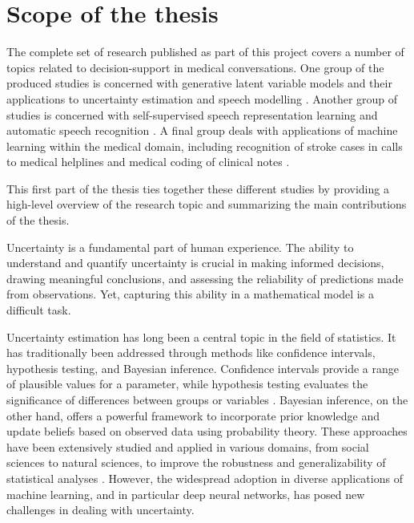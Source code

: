 

\section{Scope of the thesis}
%
%
The complete set of research published as part of this project covers a number of topics related to decision-support in medical conversations. 
One group of the produced studies is concerned with generative latent variable models and their applications to uncertainty estimation and speech modelling \cite{havtorn_hierarchical_2021,havtorn_benchmarking_2022,bergamin_modelagnostic_2022}. 
Another group of studies is concerned with self-supervised speech representation learning and automatic speech recognition \cite{borgholt_scaling_2021,borgholt_we_2021,mohamed_selfsupervised_2022,borgholt_brief_2022}. 
A final group deals with applications of machine learning within the medical domain, including recognition of stroke cases in calls to medical helplines \cite{wenstrup_retrospective_2023} and medical coding of clinical notes \cite{edin_automated_2023}. 

This first part of the thesis ties together these different studies by providing a high-level overview of the research topic and summarizing the main contributions of the thesis.









\iffalse


Uncertainty is a fundamental part of human experience. The ability to understand and quantify uncertainty is crucial in making informed decisions, drawing meaningful conclusions, and assessing the reliability of predictions made from observations. Yet, capturing this ability in a mathematical model is a difficult task. 

Uncertainty estimation has long been a central topic in the field of statistics. It has traditionally been addressed through methods like confidence intervals, hypothesis testing, and Bayesian inference. Confidence intervals provide a range of plausible values for a parameter, while hypothesis testing evaluates the significance of differences between groups or variables \cite{blitzstein_introduction_2019}. Bayesian inference, on the other hand, offers a powerful framework to incorporate prior knowledge and update beliefs based on observed data using probability theory. These approaches have been extensively studied and applied in various domains, from social sciences to natural sciences, to improve the robustness and generalizability of statistical analyses \cite{gelman_bayesian_2013}. However, the widespread adoption in diverse applications of machine learning, and in particular deep neural networks, has posed new challenges in dealing with uncertainty. 

